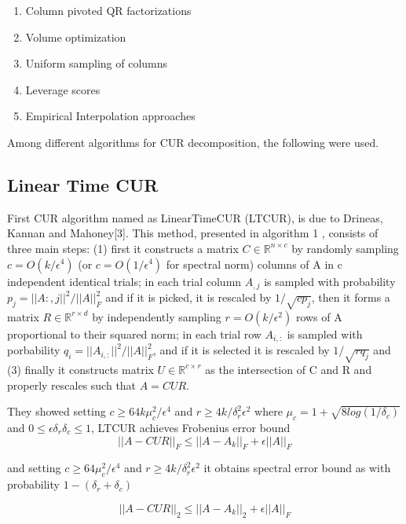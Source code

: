 \documentclass{article}
\begin{document}
\begin{enumerate}
    \item Column pivoted QR factorizations 
    \item Volume optimization 
    \item Uniform sampling of columns 
    \item Leverage scores
    \item Empirical Interpolation approaches
\end{enumerate}

Among different algorithms for CUR decomposition, the following were used.

\subsection{Linear Time CUR}

First CUR algorithm named as LinearTimeCUR (LTCUR), is due to Drineas, Kannan and Mahoney[3]. This
method, presented in algorithm 1 , consists of three main steps: (1) first it constructs a matrix $C \in \mathbb{R}^{n \times c} $
by randomly sampling $c = O(k/ \epsilon^4)$ (or $c = O(1/ \epsilon^4)$ for spectral norm) columns of A in c independent identical
trials; in each trial column $A_{,j}$ is sampled with probability $p_j = ||A:,j||^2/||A||^2_ F$ and if it is picked, it is rescaled by $1/\sqrt{cp_j}$,  then it forms a matrix $R \in \mathbb{R}^{r \times d}$ by independently sampling $r = O(k/ \epsilon^2)$ rows of A proportional
to their squared norm; in each trial row $A_{i,:}$ is sampled with porbability $q_i = ||A_{i,:}||^2/||A||^2_F$, and if it is selected it is rescaled by $1/\sqrt{rq_j}$ and (3) finally it constructs matrix $U \in \mathbb{R}^{c \times r}$ as the intersection of C and R and properly rescales such that $A = CUR$.

They showed setting $c \geq 64k\mu^2_c/\epsilon^4$ and $r \geq 4k/\delta_r^2 \epsilon^2$ where $ \mu_c = 1 + \sqrt{8log (1/\delta_c)}$ and $0 \leq \epsilon \delta_r \delta_c \leq 1$, LTCUR achieves Frobenius error bound
\begin{equation}
    ||A - CUR||_F \leq ||A - A_k||_F + \epsilon||A||_F
\end{equation}

and setting $c \geq 64\mu^2_c/\epsilon^4$ and $r \geq 4k/\delta^2_r\epsilon^2$ it obtains spectral error bound as with probability $1-(\delta_r + \delta_c)$

\begin{equation}
    ||A - CUR||_2 \leq ||A - A_k||_2 + \epsilon||A||_F
\end{equation}
\end{document}

